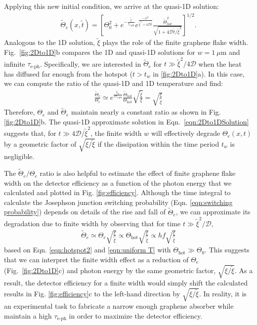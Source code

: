\documentclass[aip, amsmath,amssymb, reprint]{revtex4-1}
\newcommand{\ba}{\begin{eqnarray}}
\newcommand{\ea}{\end{eqnarray}}
\begin{document}
Applying this new initial condition, we arrive at the quasi-1D solution:
\ba \tilde{\Theta}_e(x,\tilde{t}) = \left[\Theta_0^2 + e^{-\frac{\tilde{t}}{\tau_{\text{e-ph}}}} e^{\frac{-x^2}{\tilde{\xi}^2+4\mathcal{D}\tilde{t}}}\frac{\tilde{\Theta}_{hot}^2}{\sqrt{1+4\mathcal{D}\tilde{t}/\tilde{\xi}^2}}\right]^{1/2}.\label{eqn:2Dto1DSolution}\ea Analogous to the 1D solution, $\tilde{\xi}$ plays the role of the finite graphene flake width. Fig.~\ref{fig:2Dto1D}b compares the 1D and quasi-1D solutions for $w = 1~\mu$m and infinite $\tau_{\text{e-ph}}$. Specifically, we are interested in $\tilde{\Theta}_e$ for $t \gg \tilde{\xi}^2/4\mathcal{D}$ when the heat has diffused far enough from the hotspot ($t>t_w$ in \ref{fig:2Dto1D}a). In this case, we can compute the ratio of the quasi-1D and 1D temperature and find:
\ba \frac{\tilde{\Theta}_e}{\Theta_e} \simeq e^{\frac{t_w}{2\tau_{\text{e-ph}}}}\frac{\tilde{\Theta}_{hot}}{\Theta_{\text{hot}}}\sqrt{\frac{\tilde{\xi}}{\xi}} =\sqrt{\frac{\xi}{\tilde{\xi}}}\label{eqn:CalebsGoldenRatio}\ea Therefore, $\Theta_e$ and $\tilde{\Theta}_e$ maintain nearly a constant ratio as shown in Fig. \ref{fig:2Dto1D}b. The quasi-1D approximate solution in Eqn.\ \ref{eqn:2Dto1DSolution} suggests that, for $t \gg 4\mathcal{D}/\tilde{\xi}^2$, the finite width $w$ will effectively degrade $\Theta_e(x, t)$ by a geometric factor of $\sqrt{\xi/\tilde{\xi}}$ if the dissipation within the time period $t_w$ is negligible.

The $\tilde{\Theta}_e/\Theta_e$ ratio is also helpful to estimate the effect of finite graphene flake width on the detector efficiency as a function of the photon energy that we calculated and plotted in Fig. \ref{fig:efficiency}. Although the time integral to calculate the Josephson junction switching probability (Eqn. \ref{eqn:switching probability}) depends on details of the rise and fall of $\tilde{\Theta}_e$, we can approximate its degradation due to finite width by observing that for time $t\gg\tilde{\xi}^2/\mathcal{D}$, \ba \tilde{\Theta}_e \simeq \Theta_e\sqrt{\frac{\xi}{\tilde{\xi}}} \propto \Theta_{\text{hot}}\sqrt{\frac{\xi}{\tilde{\xi}}} \propto hf\sqrt{\frac{\xi}{\tilde{\xi}}} \label{eqn:lambdashiftapprox}\ea
based on Eqn. \ref{eqn:hotspot2} and \ref{eqn:uniform T} with $\Theta_{\text{hot}}\gg\Theta_0$. This suggests that we can interpret the finite width effect as a reduction of $\Theta_e$ (Fig.~\ref{fig:2Dto1D}c) and photon energy by the same geometric factor, $\sqrt{\xi/\tilde{\xi}}$. As a result, the detector efficiency for a finite width would simply shift the calculated results in Fig. \ref{fig:efficiency}c to the left-hand direction by $\sqrt{\xi/\tilde{\xi}}$. In reality, it is an experimental task to fabricate a narrow enough graphene absorber while maintain a high $\tau_{\text{e-ph}}$ in order to maximize the detector efficiency.
\end{document}
